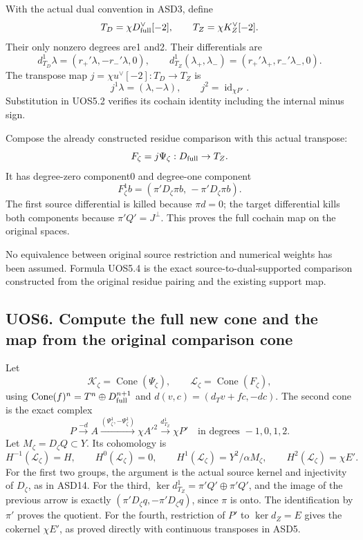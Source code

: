 With the actual dual convention in ASD3, define \[
 T_D=\chi D_{\rm full}^\vee[-2],\qquad
 T_Z=\chi K_Z^\vee[-2].
\] Their only nonzero degrees are1 and2. Their differentials are \[
 d_{T_D}^1\lambda=(r_+'\lambda,-r_-'\lambda,0),\qquad
 d_{T_Z}^1(\lambda_+,\lambda_-)
       =(r_+'\lambda_+,r_-'\lambda_-,0).
 \tag{UOS5.2}
\] The transpose map \(j=\chi u^\vee[-2]:T_D\to T_Z\) is \[
 j^1\lambda=(\lambda,-\lambda),\qquad
 j^2=\operatorname{id}_{\chi P'}.
 \tag{UOS5.3}
\] Substitution in UOS5.2 verifies its cochain identity including the
internal minus sign.

Compose the already constructed residue comparison with this actual
transpose: \[
 F_\zeta=j\Psi_\zeta:D_{\rm full}\to T_Z.
\] It has degree-zero component0 and degree-one component \[
 \boxed{
 F_\zeta^1b
 =(\pi'D_\zeta\pi b,\,-\pi'D_\zeta\pi b).}
 \tag{UOS5.4}
\] The first source differential is killed because \(\pi d=0\); the
target differential kills both components because \(\pi'Q'=J^\perp\).
This proves the full cochain map on the original spaces.

No equivalence between original source restriction and numerical weights
has been assumed. Formula UOS5.4 is the exact source-to-dual-supported
comparison constructed from the original residue pairing and the
existing support map.

\subsection{UOS6. Compute the full new cone and the map from the
original comparison
cone}\label{uos6.-compute-the-full-new-cone-and-the-map-from-the-original-comparison-cone}

Let \[
 \mathcal K_\zeta=\operatorname{Cone}(\Psi_\zeta),\qquad
 \mathcal L_\zeta=\operatorname{Cone}(F_\zeta),
\] using \(\operatorname{Cone}(f)^n=T^n\oplus D_{\rm full}^{n+1}\) and
\(d(v,c)=(d_Tv+fc,-dc)\). The second cone is the exact complex \[
 \boxed{
 P\xrightarrow{-d}A
 \xrightarrow{(\Psi_\zeta^1,-\Psi_\zeta^1)}
 \chi A'^2\xrightarrow{d_{T_Z}^1}\chi P'
 }
 \quad\text{in degrees }-1,0,1,2.
 \tag{UOS6.1}
\] Let \(M_\zeta=D_\zeta Q\subset Y\). Its cohomology is \[
 H^{-1}(\mathcal L_\zeta)=H,\qquad
 H^0(\mathcal L_\zeta)=0,\qquad
 H^1(\mathcal L_\zeta)=Y^2/\alpha M_\zeta,\qquad
 H^2(\mathcal L_\zeta)=\chi E'.
 \tag{UOS6.2}
\] For the first two groups, the argument is the actual source kernel
and injectivity of \(D_\zeta\), as in ASD14. For the third,
\(\ker d_{T_Z}^1=\pi'Q'\oplus\pi'Q'\), and the image of the previous
arrow is exactly \((\pi'D_\zeta q,-\pi'D_\zeta q)\), since \(\pi\) is
onto. The identification by \(\pi'\) proves the quotient. For the
fourth, restriction of \(P'\) to \(\ker d_Z=E\) gives the cokernel
\(\chi E'\), as proved directly with continuous transposes in ASD5.

